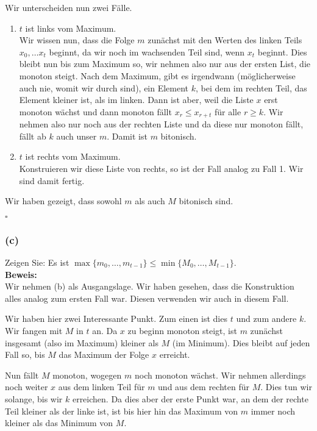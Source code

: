 \documentclass[11pt,a4paper,ngerman]{article}
\begin{document}
Wir unterscheiden nun zwei Fälle.
\begin{enumerate}[1.]
	\item $t$ ist links vom Maximum.\\
		Wir wissen nun, dass die Folge $m$ zunächst mit den Werten des linken Teils $x_0, \ldots x_t$ beginnt, da wir noch im wachsenden Teil
		sind, wenn $x_t$ beginnt. Dies bleibt nun bis zum Maximum so, wir nehmen also nur aus der ersten List, die monoton steigt.
		Nach dem Maximum, gibt es irgendwann (möglicherweise auch nie, womit wir durch sind), ein Element $k$, bei dem im rechten Teil,
		das Element kleiner ist, als im linken.
		Dann ist aber, weil die Liste $x$ erst monoton wächst und dann monoton fällt $x_{r} \leq x_{r+t}$ für alle $r \geq k$.
		Wir nehmen also nur noch aus der rechten Liste und da diese nur monoton fällt, fällt ab $k$ auch unser $m$.
		Damit ist $m$ bitonisch.
	\item $t$ ist rechts vom Maximum.\\
		 Konstruieren wir diese Liste von rechts, so ist der Fall analog zu Fall 1. Wir sind damit fertig.
\end{enumerate}

Wir haben gezeigt, dass sowohl $m$ als auch $M$ bitonisch sind.

\mbox{}\hfill$\square$

\subsubsection*{(c)}
Zeigen Sie: Es ist $\max \{ m_0 , \ldots, m_{t-1}\} \leq \min \{ M_0, \ldots, M_{t-1}\}$.\\

\noindent\textbf{Beweis:}\\

Wir nehmen (b) als Ausgangslage. Wir haben gesehen, dass die Konstruktion alles analog zum ersten Fall war. Diesen verwenden wir auch in diesem Fall.

Wir haben hier zwei Interessante Punkt. Zum einen ist dies $t$ und zum andere $k$. Wir fangen mit $M$ in $t$ an. Da $x$ zu beginn monoton steigt, ist $m$ zunächst insgesamt (also im Maximum) kleiner als $M$ (im Minimum). Dies bleibt auf jeden Fall so, bis $M$ das Maximum der Folge $x$ erreicht.

Nun fällt $M$ monoton, wogegen $m$ noch monoton wächst. Wir nehmen allerdings noch weiter $x$ aus dem linken Teil für $m$ und aus dem rechten für $M$. Dies tun wir solange, bis wir $k$ erreichen. Da dies aber der erste Punkt war, an dem der rechte Teil kleiner als der linke ist, ist bis hier hin
das Maximum von $m$ immer noch kleiner als das Minimum von $M$.
\end{document}
